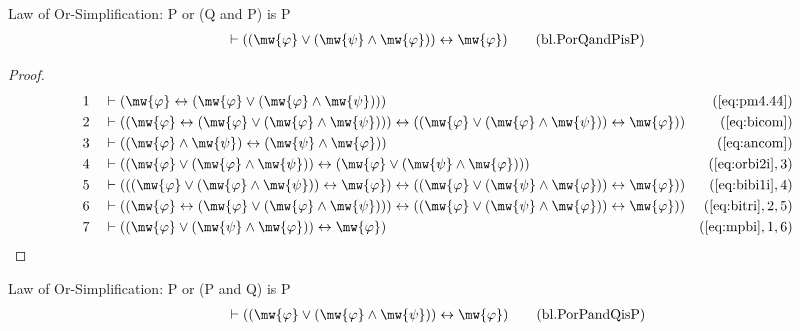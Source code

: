 \begin{lemma} {Law of Or-Simplification: P or (Q
and P) is P}
\begin{align}
\vdash ( ( \mw{\varphi} \vee ( \mw{\psi} \wedge \mw{\varphi} ) )
    \leftrightarrow \mw{\varphi} )\label{eq:bl.PorQandPisP}\tag{bl.PorQandPisP}
\end{align}
\end{lemma}


\begin{proof}
\begin{align}
  1 &&  & \vdash ( \mw{\varphi} \leftrightarrow ( \mw{\varphi} \vee (
     \mw{\varphi} \wedge \mw{\psi} ) )
     )&(\mbox{\ref{eq:pm4.44}})\notag
  \\ 2 &&  & \vdash ( ( \mw{\varphi} \leftrightarrow ( \mw{\varphi} \vee (
     \mw{\varphi} \wedge \mw{\psi} ) ) ) \leftrightarrow (
     ( \mw{\varphi} \vee ( \mw{\varphi} \wedge \mw{\psi} )
     ) \leftrightarrow \mw{\varphi} )
     )&(\mbox{\ref{eq:bicom}})\notag
  \\ 3 &&  & \vdash ( ( \mw{\varphi} \wedge \mw{\psi} ) \leftrightarrow (
     \mw{\psi} \wedge \mw{\varphi} )
     )&(\mbox{\ref{eq:ancom}})\notag
  \\ 4 &&  & \vdash ( ( \mw{\varphi} \vee ( \mw{\varphi} \wedge \mw{\psi} ) )
     \leftrightarrow ( \mw{\varphi} \vee ( \mw{\psi}
     \wedge \mw{\varphi} ) )
     )&(\mbox{\ref{eq:orbi2i}},3)\notag
  \\ 5 &&  & \vdash ( ( ( \mw{\varphi} \vee ( \mw{\varphi} \wedge \mw{\psi} ) )
     \leftrightarrow \mw{\varphi} ) \leftrightarrow ( (
     \mw{\varphi} \vee ( \mw{\psi} \wedge \mw{\varphi} ) )
     \leftrightarrow \mw{\varphi} )
     )&(\mbox{\ref{eq:bibi1i}},4)\notag
  \\ 6 &&  & \vdash ( ( \mw{\varphi} \leftrightarrow ( \mw{\varphi} \vee (
     \mw{\varphi} \wedge \mw{\psi} ) ) ) \leftrightarrow (
     ( \mw{\varphi} \vee ( \mw{\psi} \wedge \mw{\varphi} )
     ) \leftrightarrow \mw{\varphi} )
     )&(\mbox{\ref{eq:bitri}},2,5)\notag
  \\ 7 &&  & \vdash ( ( \mw{\varphi} \vee ( \mw{\psi} \wedge \mw{\varphi} ) )
     \leftrightarrow \mw{\varphi}
     )&(\mbox{\ref{eq:mpbi}},1,6)\notag
\end{align}
\end{proof}

\begin{lemma} {Law of Or-Simplification: P or (P
and Q) is P}
\begin{align}
\vdash ( ( \mw{\varphi} \vee ( \mw{\varphi} \wedge \mw{\psi} ) )
    \leftrightarrow \mw{\varphi} )\label{eq:bl.PorPandQisP}\tag{bl.PorPandQisP}
\end{align}
\end{lemma}


